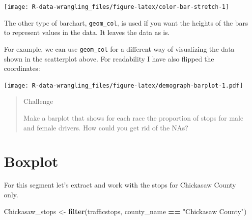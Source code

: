 \documentclass[]{book}
\newenvironment{Shaded}{\begin{snugshade}}{\end{snugshade}}
\newcommand{\KeywordTok}[1]{\textcolor[rgb]{0.13,0.29,0.53}{\textbf{#1}}}
\newcommand{\DataTypeTok}[1]{\textcolor[rgb]{0.13,0.29,0.53}{#1}}
\newcommand{\FloatTok}[1]{\textcolor[rgb]{0.00,0.00,0.81}{#1}}
\newcommand{\StringTok}[1]{\textcolor[rgb]{0.31,0.60,0.02}{#1}}
\newcommand{\OperatorTok}[1]{\textcolor[rgb]{0.81,0.36,0.00}{\textbf{#1}}}
\newcommand{\NormalTok}[1]{#1}
\theoremstyle{definition}
\theoremstyle{definition}
\theoremstyle{definition}
\theoremstyle{remark}
\begin{document}
\texttt{[image: R-data-wrangling\_files/figure-latex/color-bar-stretch-1]}

The other type of barchart, \texttt{geom\_col}, is used if you want the
heights of the bars to represent values in the data. It leaves the data
as is.

For example, we can use \texttt{geom\_col} for a different way of
visualizing the data shown in the scatterplot above. For readability I
have also flipped the coordinates:

\begin{Shaded}
\end{Shaded}

\texttt{[image: R-data-wrangling\_files/figure-latex/demograph-barplot-1.pdf]}

\begin{quote}
Challenge

Make a barplot that shows for each race the proportion of stops for male
and female drivers. How could you get rid of the NAs?
\end{quote}

\section{Boxplot}\label{boxplot}

For this segment let's extract and work with the stops for Chickasaw
County only.

\begin{Shaded}
\begin{Highlighting}[]
\NormalTok{Chickasaw_stops <-}\StringTok{ }\KeywordTok{filter}\NormalTok{(trafficstops, county_name }\OperatorTok{==}\StringTok{ "Chickasaw County"}\NormalTok{)}
\end{Highlighting}
\end{Shaded}
\end{document}
